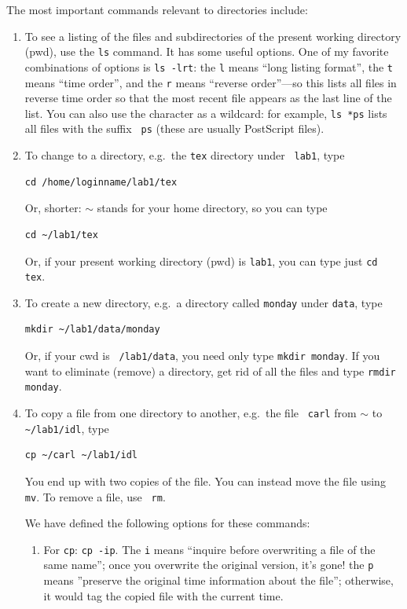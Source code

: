 \documentclass[]{article}
\begin{document}
The most important commands relevant to directories include: \begin{enumerate}

\item To see a listing of the files and subdirectories of the present working
directory (pwd), use
the {\tt ls} command.  It has some useful
options. One of my favorite combinations of options is {\tt ls -lrt}:
the {\tt l} means ``long listing format'', the {\tt t} means ``time
order'', and the {\tt r} means ``reverse order''---so this lists all
files in reverse time order so that the most recent file appears as the
last line of the list. You can also use the {\tt *} character as a
wildcard: for example, {\tt ls *ps} lists all files with the suffix {\tt
    ps} (these are usually PostScript files). 

\item To change to a directory, e.g.\ the {\tt tex} directory under {\tt
  lab1}, type 
\begin{verbatim}
cd /home/loginname/lab1/tex
\end{verbatim}
Or, shorter: $\sim$ stands for your home directory, so you can type
\begin{verbatim}
cd ~/lab1/tex
\end{verbatim}
Or, if your present working directory (pwd) is
  {\tt lab1}, you can type just {\tt cd tex}.


\item To create a new directory, e.g.\ a directory called {\tt monday}
  under {\tt data}, type 
\begin{verbatim}
mkdir ~/lab1/data/monday
\end{verbatim}
Or, if your cwd is {\tt ~/lab1/data}, you need only type {\tt mkdir monday}. If
  you want to eliminate (remove) a directory, get rid of all the files
  and type {\tt rmdir monday}.

\item To copy a file from one directory to another, e.g.\ the file {\tt
  carl} from $\sim$ to {\tt \~{}/lab1/idl}, type
\begin{verbatim}
cp ~/carl ~/lab1/idl
\end{verbatim}
 You end up with two copies of the file. You
  can instead move the file using {\tt mv}. To remove a file, use {\tt
  rm}.

We have defined the following options for these commands:
\begin{enumerate}

\item For {\tt cp}: {\tt cp -ip}. The {\tt i} means ``inquire before
  overwriting a file of the same name''; once you overwrite the original
  version, it's gone! the {\tt p} means ''preserve the original time
  information about the file''; otherwise, it would tag the copied file
  with the current time.


\end{enumerate}
\end{enumerate}
\end{document}
